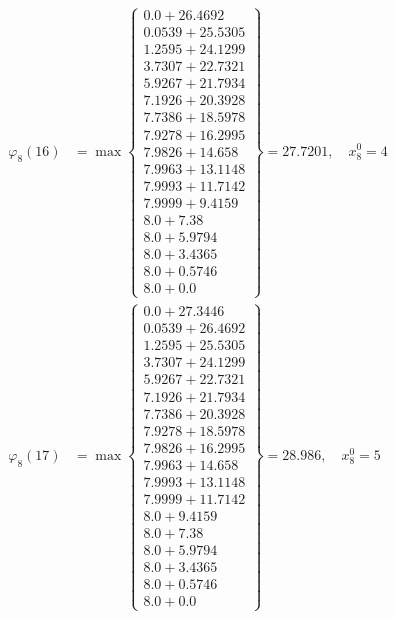 \documentclass{article}
\begin{document}
\begin{align*}
\varphi_{8}(16) &= \max \left\{ \begin{array}{c}
0.0 + 26.4692 \\
 0.0539 + 25.5305 \\
 1.2595 + 24.1299 \\
 3.7307 + 22.7321 \\
 5.9267 + 21.7934 \\
 7.1926 + 20.3928 \\
 7.7386 + 18.5978 \\
 7.9278 + 16.2995 \\
 7.9826 + 14.658 \\
 7.9963 + 13.1148 \\
 7.9993 + 11.7142 \\
 7.9999 + 9.4159 \\
 8.0 + 7.38 \\
 8.0 + 5.9794 \\
 8.0 + 3.4365 \\
 8.0 + 0.5746 \\
 8.0 + 0.0
\end{array} \right\}=27.7201, \quad x_{8}^0=4\\
  
\varphi_{8}(17) &= \max \left\{ \begin{array}{c}
0.0 + 27.3446 \\
 0.0539 + 26.4692 \\
 1.2595 + 25.5305 \\
 3.7307 + 24.1299 \\
 5.9267 + 22.7321 \\
 7.1926 + 21.7934 \\
 7.7386 + 20.3928 \\
 7.9278 + 18.5978 \\
 7.9826 + 16.2995 \\
 7.9963 + 14.658 \\
 7.9993 + 13.1148 \\
 7.9999 + 11.7142 \\
 8.0 + 9.4159 \\
 8.0 + 7.38 \\
 8.0 + 5.9794 \\
 8.0 + 3.4365 \\
 8.0 + 0.5746 \\
 8.0 + 0.0
\end{array} \right\}=28.986, \quad x_{8}^0=5\\
  

\end{align*}
\end{document}
